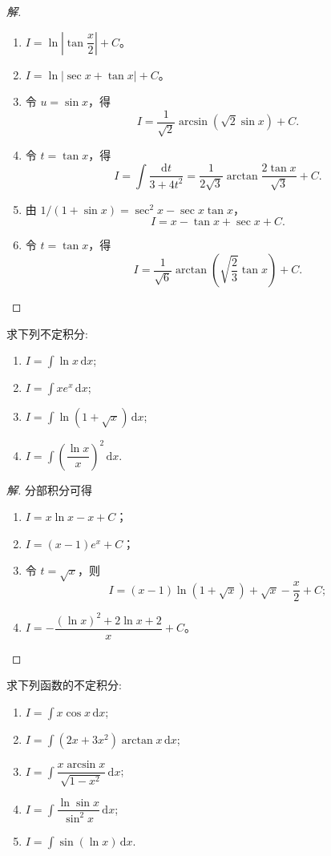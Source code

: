 \documentclass[../../数学分析培优讲义(答案版).tex]{subfiles}
\begin{document}
\begin{proof}[解]
\begin{enumerate}[label=(\arabic*)]
    \item $\displaystyle I=\ln\left|\tan\dfrac{x}{2}\right|+C$。
    \item $\displaystyle I=\ln|\sec x+\tan x|+C$。
    \item 令 $u=\sin x$，得
    \[
        I=\dfrac{1}{\sqrt2}\arcsin(\sqrt2\sin x)+C.
    \]
    \item 令 $t=\tan x$，得
    \[
        I=\int\dfrac{\mathrm{d}t}{3+4t^2}
        =\dfrac{1}{2\sqrt3}\arctan\dfrac{2\tan x}{\sqrt3}+C.
    \]
    \item 由 $1/(1+\sin x)=\sec^2x-\sec x\tan x$，
    \[
        I=x-\tan x+\sec x+C.
    \]
    \item 令 $t=\tan x$，得
    \[
        I=\dfrac{1}{\sqrt6}\arctan\left(\sqrt{\dfrac{2}{3}}\tan x\right)+C.
    \]
\end{enumerate}
\end{proof}

\begin{example}
求下列不定积分:
\begin{enumerate}[label=(\arabic*)]
    \item $\displaystyle I=\int\ln x\,\mathrm{d}x$;
    \item $\displaystyle I=\int xe^x\,\mathrm{d}x$;
    \item $\displaystyle I=\int\ln(1+\sqrt{x})\,\mathrm{d}x$;
    \item $\displaystyle I=\int\left(\dfrac{\ln x}{x}\right)^2\,\mathrm{d}x$.
\end{enumerate}
\end{example}

\begin{proof}[解]
分部积分可得
\begin{enumerate}[label=(\arabic*)]
    \item $\displaystyle I=x\ln x-x+C$；
    \item $\displaystyle I=(x-1)e^x+C$；
    \item 令 $t=\sqrt{x}$，则
    \[
        I=(x-1)\ln(1+\sqrt{x})+\sqrt{x}-\dfrac{x}{2}+C;
    \]
    \item $\displaystyle I=-\dfrac{(\ln x)^2+2\ln x+2}{x}+C$。
\end{enumerate}
\end{proof}

\begin{example}
求下列函数的不定积分:
\begin{enumerate}[label=(\arabic*)]
    \item $\displaystyle I=\int x\cos x\,\mathrm{d}x$;
    \item $\displaystyle I=\int(2x+3x^2)\arctan x\,\mathrm{d}x$;
    \item $\displaystyle I=\int\dfrac{x\arcsin x}{\sqrt{1-x^2}}\,\mathrm{d}x$;
    \item $\displaystyle I=\int\dfrac{\ln\sin x}{\sin^2x}\,\mathrm{d}x$;
    \item $\displaystyle I=\int\sin(\ln x)\,\mathrm{d}x$.
\end{enumerate}
\end{example}
\end{document}
